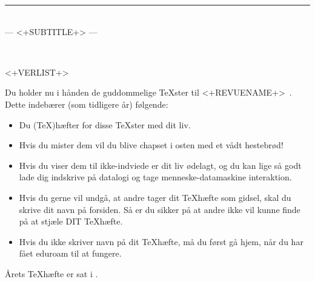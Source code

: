 \documentclass[11pt]{article}
\begin{document}
\thispagestyle{empty}

\begin{flushright}
	{\tiny <+TOPQUOTE+>}
\end{flushright}
\hrule
\begin{center}
{}
\\ {\frfontii --- <+SUBTITLE+> ---}
\vspace{2cm}

{}\\ %
\vspace{5mm}
{\cmfnttt{\today}}
%
\end{center}
\begin{footnotesize}
  \begin{sffamily}
    \begin{inparaitem}[\hspace{-0.26em},]
      <+VERLIST+>
    \end{inparaitem}
  \end{sffamily}
\end{footnotesize}
\vspace{1cm}


\begin{center}

\Large
Du holder nu i hånden de guddommelige \TeX ster til <+REVUENAME+>\ <+REVUEYEAR+>. Dette indebærer (som tidligere år) følgende:
\begin{itemize}
\item Du (\TeX)hæfter for disse \TeX ster med dit liv.
\item Hvis du mister dem vil du blive chapset i osten med et vådt hestebrød!
\item Hvis du viser dem til ikke-indviede er dit liv ødelagt, og du kan lige så 
godt lade dig indskrive på datalogi og tage menneske-datamaskine interaktion.
\item Hvis du gerne vil undgå, at andre tager dit \TeX hæfte som gidsel,
skal du skrive dit navn på forsiden. Så er du sikker på at andre ikke vil kunne
finde på at stjæle DIT \TeX hæfte. 
\item Hvis du ikke skriver navn på dit \TeX hæfte, må du først gå hjem, når du har fået eduroam til at fungere.
\end{itemize}
\end{center}
\vfill



\vfill
Årets \TeX hæfte er sat i \LaTeXe.
\begin{center}
	{\tiny <+BOTTOMQUOTE+>}
\end{center}
\end{document}
